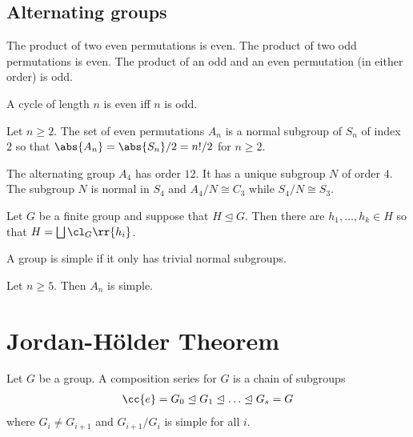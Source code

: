 \documentclass{article}
\begin{document}
\subsection{Alternating groups}

\begin{lemma}
  The product of two even permutations is even. The product of two odd permutations
  is even. The product of an odd and an even permutation (in either order) is odd.

  A cycle of length $n$ is even iff $n$ is odd.
\end{lemma}

\begin{theorem}
  Let $n\geq 2$. The set of even permutations $A_n$ is a normal subgroup of $S_n$
  of index $2$ so that $\abs{A_n}=\abs{S_n}/2=n!/2$ for $n\geq 2$.
\end{theorem}

\begin{proposition}
  The alternating group $A_4$ has order $12$. It has a unique subgroup $N$ of order $4$.
  The subgroup $N$ is normal in $S_4$ and $A_4/N\cong C_3$ while $S_4/N\cong S_3$.
\end{proposition}

\begin{lemma}
  Let $G$ be a finite group and suppose that $H\trianglelefteq G$. Then there are
  $h_1,\ldots,h_k\in H$ so that $H=\bigsqcup\cl_G\rr{h_i}$.
\end{lemma}

\begin{definition}
  A group is simple if it only has trivial normal subgroups.
\end{definition}

\begin{theorem}
  Let $n\geq 5$. Then $A_n$ is simple.
\end{theorem}

\section{Jordan-H\"older Theorem}

\begin{definition}
  Let $G$ be a group. A composition series for $G$ is a chain of subgroups
  \begin{align*}
    \cc{e}=G_0\trianglelefteq G_1\trianglelefteq\ldots\trianglelefteq G_s = G
  \end{align*}
  where $G_i\neq G_{i+1}$ and $G_{i+1}/G_i$ is simple for all $i$.
\end{definition}
\end{document}
